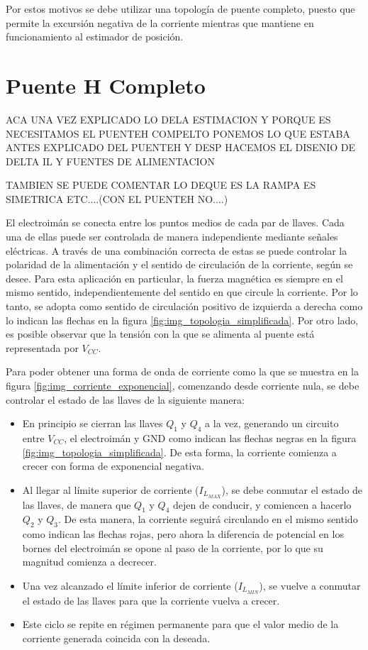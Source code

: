 \noindent Por estos motivos se debe utilizar una topología de puente completo, puesto que permite la excursión negativa de la corriente mientras que mantiene en funcionamiento al estimador de posición.

\section{Puente H Completo}

ACA UNA VEZ EXPLICADO LO DELA ESTIMACION Y PORQUE ES NECESITAMOS EL PUENTEH COMPELTO PONEMOS LO QUE ESTABA ANTES EXPLICADO DEL PUENTEH Y DESP HACEMOS EL DISENIO DE DELTA IL Y FUENTES DE ALIMENTACION

TAMBIEN SE PUEDE COMENTAR LO DEQUE ES LA RAMPA ES SIMETRICA ETC....(CON EL PUENTEH NO....)

El electroimán se conecta entre los puntos medios de cada par de llaves. Cada una de ellas puede ser controlada de manera independiente mediante señales eléctricas. A través de una combinación correcta de estas se puede controlar la polaridad de la alimentación y el sentido de circulación de la corriente, según se desee. Para esta aplicación en particular, la fuerza magnética es siempre en el mismo sentido, independientemente del sentido en que circule la corriente. Por lo tanto, se adopta como sentido de circulación positivo de izquierda a derecha como lo indican las flechas en la figura \ref{fig:img_topologia_simplificada}. Por otro lado, es posible observar que la tensión con la que se alimenta al puente está representada por $V_{CC}$.


Para poder obtener una forma de onda de corriente como la que se muestra en la figura \ref{fig:img_corriente_exponencial}, comenzando desde corriente nula, se debe controlar el estado de las llaves de la siguiente manera:


\begin{itemize}
	\item En principio se cierran las llaves $Q_1$ y $Q_4$ a la vez, generando un circuito entre $V_{CC}$, el electroimán y GND como indican las flechas negras en la figura \ref{fig:img_topologia_simplificada}. De esta forma, la corriente comienza a crecer con forma de exponencial negativa.
	\item Al llegar al límite superior de corriente ($I_{L_{MAX}}$), se debe conmutar el estado de las llaves, de manera que $Q_1$ y $Q_4$ dejen de conducir, y comiencen a hacerlo $Q_2$ y $Q_3$. De esta manera, la corriente seguirá circulando en el mismo sentido como indican las flechas rojas, pero ahora la diferencia de potencial en los bornes del electroimán se opone al paso de la corriente, por lo que su magnitud comienza a decrecer.
	\item Una vez alcanzado el límite inferior de corriente ($I_{L_{MIN}}$), se vuelve a conmutar el estado de las llaves para que la corriente vuelva a crecer.
	\item Este ciclo se repite en régimen permanente para que el valor medio de la corriente generada coincida con la deseada. 
\end{itemize}

